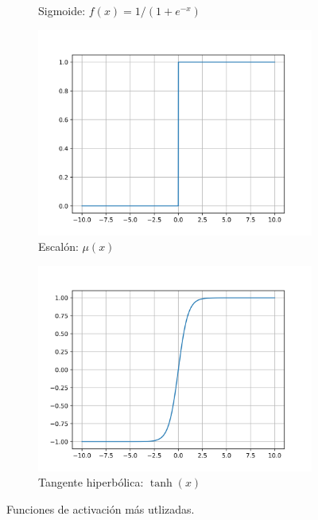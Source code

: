 \begin{figure}[bth]
\begin{subfigure}{.45\textwidth}
        \caption{Sigmoide: $f(x)=1 / (1 + e^{-x})$}
    \end{subfigure}
    \hfill
    \begin{subfigure}{.45\textwidth}
        \centering
        \includegraphics[width=1\textwidth]{imgs/activacion/step.png}
        \caption{Escalón: $\mu(x)$}
    \end{subfigure}
    \begin{subfigure}{.45\textwidth}
        \centering
        \includegraphics[width=1\textwidth]{imgs/activacion/tanh.png}
        \caption{Tangente hiperbólica: $\tanh(x)$}
    \end{subfigure}
    \caption{Funciones de activación más utlizadas.}
    \label{fig:funciones-activacion}
\end{figure}


